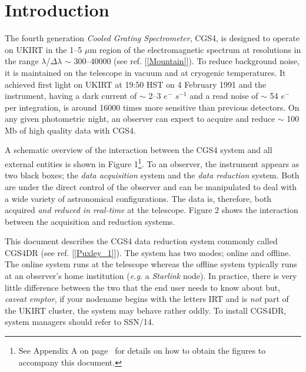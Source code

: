 \newpage
\section{Introduction}
\label{introduction}

The fourth generation {\sl Cooled Grating Spectrometer}, CGS4, is designed to 
operate on UKIRT in the 1--5 $\mu$m region of the electromagnetic spectrum at 
resolutions in the range $\lambda$/$\Delta\lambda$ $\sim$ 300--40000
(see ref. [\ref{Mountain}]). To reduce background noise, it is maintained on 
the telescope in vacuum and at cryogenic temperatures. It achieved first light 
on UKIRT at 19:50 HST on 4 February 1991 and the instrument, having a dark 
current of $\sim$ 2--3 $e^{-}$ $s^{-1}$ and a read noise of $\sim$ 54 $e^{-}$ 
per integration, is around 16000 times more sensitive than previous detectors. 
On any given photometric night, an observer can expect to acquire and reduce 
$\sim$ 100 Mb of high quality data with CGS4.

A schematic overview of the interaction between the CGS4 system and all external
entities is shown in Figure 1\footnote{See Appendix A on 
page~\pageref{figures} for details on how to obtain the figures to accompany 
this document.}. To an observer, the instrument appears as two black boxes; the
{\em data acquisition} system and the {\em data reduction} system. Both are 
under the direct control of the observer and can be manipulated to deal with 
a wide variety of astronomical configurations. The data is, therefore, both 
acquired {\em and reduced in real-time} at the telescope. Figure 2 
shows the interaction between the acquisition and 
reduction systems.

This document describes the CGS4 data reduction system commonly called CGS4DR
(see ref. [\ref{Puxley_1}]).
The system has two modes; online and offline. The online system runs at the 
telescope whereas the offline system typically runs at an observer's home 
institution ({\em e.g.} a {\sl Starlink} node). In practice, there is very
little difference between the two that the end user needs to know about
but, {\em caveat emptor}, if your nodename begins with the 
letters IRT and is {\em not} part of the UKIRT cluster, the system may 
behave rather oddly. To install CGS4DR, system managers should refer to 
SSN/14.

